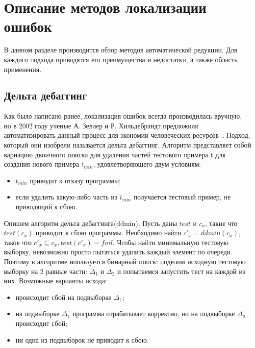 \chapter{Описание методов локализации ошибок}
В данном разделе производится обзор методов автоматической редукции. Для каждого подхода приводятся его преимущества и недостатки, а также область применения.
\section{Дельта дебаггинг}
Как было написано ранее, локализация ошибок всегда производилась вручную, но в 2002 году ученые
А. Зеллер и Р. Хильдебрандт предложили автоматизировать данный процесс для экономии человеческих ресурсов~\cite{zeller2002simplifying}. Подход, который они изобрели называется дельта дебаггинг. Алгоритм представляет собой вариацию двоичного поиска для удаления частей тестового примера t для создания нового примера $t_{min}$, удовлетворяющего двум условиям:
\begin{itemize}
\item $t_{min}$ приводит к отказу программы;
\item если удалить какую-либо часть из $t_{min}$ получается тестовый пример, не приводящий к сбою.
\end{itemize}
Опишем алгоритм дельта дебаггинга(ddmin). Пусть даны $test$ и $c_x$, такие что $test(c_x)$ приводит к сбою программы. Необходимо найти $c'_x = ddmin(c_x)$, такое что $c'_x \subseteq c_x, test(c'_x) = fail$. Чтобы найти минимальную тестовую выборку, невозможно просто пытаться удалить каждый элемент по очереди. Поэтому в алгоритме ипользуется бинарный поиск: поделим исходную тестовую выборку на 2 равные части: $\Delta_1$ и $\Delta_2$ и попытаемся запустить тест на каждой из них. Возможные варианты исхода:
\begin{itemize}
\item происходит сбой на подвыборке $\Delta_1$;
\item на подвыборке $\Delta_1$ программа отрабатывает корректно, но на подвыборке $\Delta_2$ происходит сбой;
\item ни одна из подвыборок не приводит к сбою.
\end{itemize}
